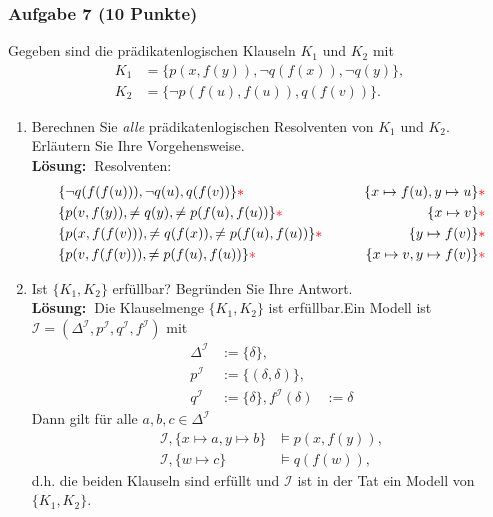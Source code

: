 \documentclass[a4paper,10pt]{article}
\newcommand{\f}[1]{\textbf{#1}}
\newcommand{\LOES}{\f{Lösung:~}}
\newcommand{\INT}{\mathcal{I}}
\begin{document}
\subsubsection*{Aufgabe 7 (10 Punkte)}
Gegeben sind die prädikatenlogischen Klauseln $K_1$ und $K_2$ mit 
\begin{align*}
K_1 &= \{p(x,f(y)), \neg q(f(x)), \neg q(y)\}, \\
K_2 &= \{\neg p(f(u), f(u)), q(f(v))\}.
\end{align*}
\begin{enumerate}
\item Berechnen Sie \textit{alle} prädikatenlogischen Resolventen von $K_1$ und $K_2$. Erläutern Sie Ihre Vorgehensweise. \\
\LOES Resolventen:
\begin{align*}
&\{\neg q(f(f(u))), \neg q(u), q(f(v)) \}{\textcolor{red}{* }} \qquad &\{x \mapsto f(u), y \mapsto u\}{\textcolor{red}{* }} \\
&\{p(v,f(y)), \neq q(y), \neq p(f(u),f(u)) \}{\textcolor{red}{* }} \qquad &\{x \mapsto v\}{\textcolor{red}{* }} \\
&\{p(x,f(f(v))), \neq q(f(x)), \neq p(f(u),f(u)) \}{\textcolor{red}{* }} \qquad &\{y \mapsto f(v)\}{\textcolor{red}{* }} \\
&\{p(v,f(f(v))), \neq p(f(u),f(u)) \}{\textcolor{red}{* }} \qquad &\{x \mapsto v, y \mapsto f(v)\}{\textcolor{red}{* }} \\
\end{align*}
\item Ist $\{K_1, K_2\}$ erfüllbar? Begründen Sie Ihre Antwort. \\
\LOES Die Klauselmenge $\{K_1, K_2\}$ ist erfüllbar.\POINT Ein Modell ist $\INT = (\Delta^{\INT}, p^{\INT}, q^{\INT}, f^{\INT})$ mit 
\begin{align*}
\Delta^{\INT} &:= \{\delta\}, \\
p^{\INT} &:= \{(\delta,\delta)\}, \\
q^{\INT} &:= \{\delta\},
f^{\INT}(\delta) &:= \delta
\end{align*}
Dann gilt für alle $a,b,c \in \Delta^{\INT}$
\begin{align*}
\INT, \{x \mapsto a, y \mapsto b\} &\models p(x,f(y)),\\
\INT, \{w \mapsto c\} &\models q(f(w)),
\end{align*}
d.h. die beiden Klauseln sind erfüllt und $\INT$ ist in der Tat ein Modell von $\{K_1, K_2\}$.\POINT
\end{enumerate}
\end{document}

